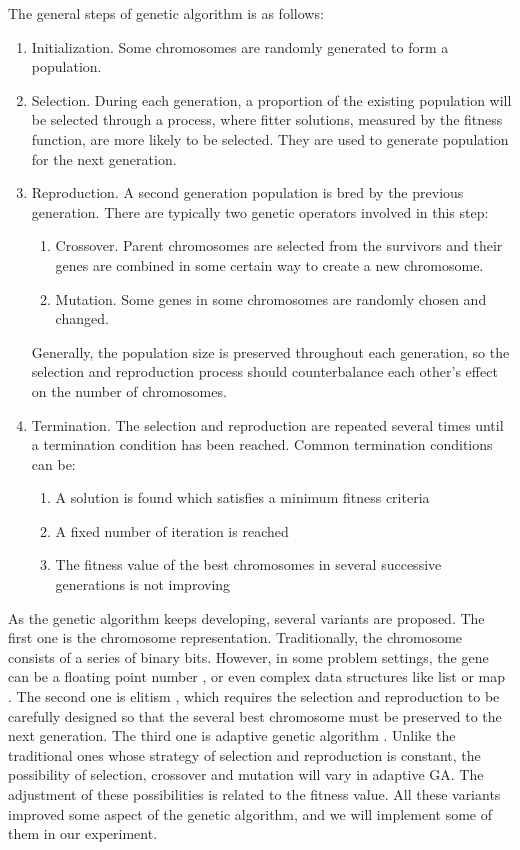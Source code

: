 \documentclass{article}
\begin{document}
The general steps of genetic algorithm is as follows:
\begin{enumerate}
	\item Initialization. Some chromosomes are randomly generated to form a population.
	\item Selection. During each generation, a proportion of the existing population will be selected
		through a process, where fitter solutions, measured by the fitness function, are more likely to be
		selected. They are used to generate population for the next generation.
	\item Reproduction. A second generation population is bred by the previous generation. There are typically
		two genetic operators involved in this step:
		\begin{enumerate}
			\item Crossover. Parent chromosomes are selected from the survivors and their genes are combined in some certain way
				to create a new chromosome.
			\item Mutation. Some genes in some chromosomes are randomly chosen and changed.
		\end{enumerate}
		Generally, the population size is preserved throughout each generation,
		so the selection and reproduction process should counterbalance each other's effect on the number of chromosomes.
	\item Termination. The selection and reproduction are repeated several times until a termination condition has been reached.
		Common termination conditions can be:
		\begin{enumerate}
			\item A solution is found which satisfies a minimum fitness criteria
			\item A fixed number of iteration is reached
			\item The fitness value of the best chromosomes in several successive generations is not improving
		\end{enumerate}
\end{enumerate}

As the genetic algorithm keeps developing, several variants are proposed.
The first one is the chromosome representation.
Traditionally, the chromosome consists of a series of binary bits.
However, in some problem settings, the gene can be a floating point number
\cite{an-experimental-comparison-of-binary-and-floating}, or even complex data structures like
list or map \cite{helga-a-heterogeneous-encoding}.
The second one is elitism \cite{removing-the-genetics-from-the-standard-genetic-algorithm},
which requires the selection and reproduction to be carefully designed so that
the several best chromosome must be preserved to the next generation.
The third one is adaptive genetic algorithm \cite{adaptive-probabilities-of-crossover-and-mutation}.
Unlike the traditional ones whose strategy of selection and reproduction is constant,
the possibility of selection, crossover and mutation will vary in adaptive GA.
The adjustment of these possibilities is related to the fitness value.
All these variants improved some aspect of the genetic algorithm,
and we will implement some of them in our experiment.
\end{document}
